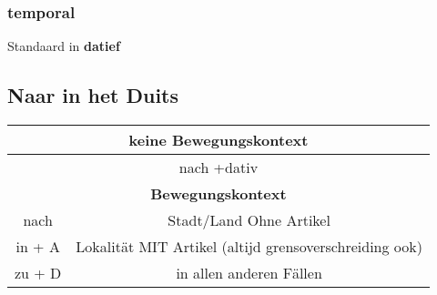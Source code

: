\documentclass[main.tex]{subfiles}
\begin{document}
\subsubsection{temporal}
Standaard in \textbf{datief}\\


\subsection{Naar in het Duits}
\begin{tabular}{| c | c | c | c |}
\hline
\multicolumn{4}{|c|}{\textbf{keine Bewegungskontext}}\\
\hline
\multicolumn{4}{|c|}{nach +dativ}\\
\hline
\hline
\multicolumn{4}{|c|}{\textbf{Bewegungskontext}}\\
\hline
nach & \multicolumn{3}{|c|}{Stadt/Land Ohne Artikel}\\
\hline
in + A & \multicolumn{3}{|c|}{Lokalität MIT Artikel (altijd grensoverschreiding ook)}\\
\hline
zu + D & \multicolumn{3}{|c|}{in allen anderen Fällen}\\
\hline
\end{tabular}
\end{document}
